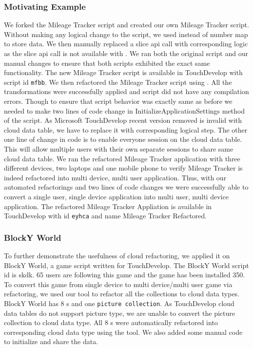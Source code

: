 \documentclass{sigplanconf}
\begin{document}
\subsubsection{Motivating Example}
We forked the Mileage Tracker script and created our own Mileage Tracker script. Without making any logical change to the script, we used \NC{} instead of number map to store data. We then manually replaced a slice api call with corresponding logic as the slice api call is not available with \NC{}. We ran both the original script and our manual changes to ensure that both scripts exhibited the exact same functionality. The new Mileage Tracker script is available in TouchDevelop with script id \texttt{mfbb}.  We then refactored the Mileage Tracker script using \tool. All the transformations were successfully applied and script did not have any compilation errors. Though to ensure that script behavior was exactly same as before we needed to make two lines of code change in InitializeApplicationSettings method of the script. As Microsoft TouchDevelop recent version removed is invalid with cloud data table, we have to replace it with corresponding logical step. The other one line of change in code is to enable everyone session on the cloud data table. This will allow multiple users with their own separate sessions to share same cloud data table. We ran the refactored Mileage Tracker application with three different devices, two laptops and one mobile phone to verify Mileage Tracker is indeed refactored into multi device, multi user application. Thus, with our automated refactorings and two lines of code changes we were successfully able to convert a single user, single device application into multi user, multi device application. The refactored Mileage Tracker Appliation is available in TouchDevelop with id \texttt{eyhca} and name Mileage Tracker Refactored. 

\subsubsection{BlockY World}
To further demonstrate the usefulness of cloud refactoring, we applied it on BlockY World, a game script written for TouchDevelop. The BlockY World script id is skdk. 65 users are following this game and the game has been installed 350.  To convert this game from single device to multi device/multi user game via refactoring, we used our tool to refactor all the collections to cloud data types. BlockY World has 8 \NC{}s and one \texttt{picture collection}. As TouchDevelop cloud data tables do not support picture type, we are unable to convert the picture collection to cloud data type.  All 8 \NC{}s were automatically refactored into corresponding cloud data type using the tool. We also added some manual code to initialize and share the data. 
\end{document}
